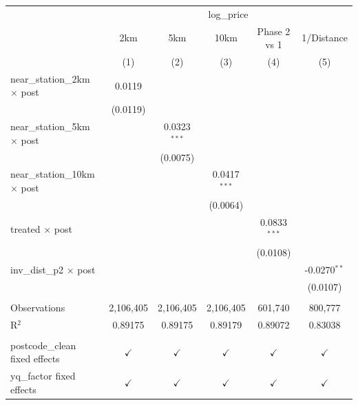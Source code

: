    \begin{tabular}{lccccc}
      \toprule
       & \multicolumn{5}{c}{log\_price}\\
                                           & 2km           & 5km            & 10km           & Phase 2 vs 1   & 1/Distance \\   
                                           & (1)           & (2)            & (3)            & (4)            & (5)\\  
      \midrule 
      near\_station\_2km $\times$ post     & 0.0119        &                &                &                &   \\   
                                           & (0.0119)      &                &                &                &   \\   
      near\_station\_5km $\times$ post     &               & 0.0323$^{***}$ &                &                &   \\   
                                           &               & (0.0075)       &                &                &   \\   
      near\_station\_10km $\times$ post    &               &                & 0.0417$^{***}$ &                &   \\   
                                           &               &                & (0.0064)       &                &   \\   
      treated $\times$ post                &               &                &                & 0.0833$^{***}$ &   \\   
                                           &               &                &                & (0.0108)       &   \\   
      inv\_dist\_p2 $\times$ post          &               &                &                &                & -0.0270$^{**}$\\   
                                           &               &                &                &                & (0.0107)\\   
       \\
      Observations                         & 2,106,405     & 2,106,405      & 2,106,405      & 601,740        & 800,777\\  
      R$^2$                                & 0.89175       & 0.89175        & 0.89179        & 0.89072        & 0.83038\\  
       \\
      postcode\_clean fixed effects        & $\checkmark$  & $\checkmark$   & $\checkmark$   & $\checkmark$   & $\checkmark$\\   
      yq\_factor fixed effects             & $\checkmark$  & $\checkmark$   & $\checkmark$   & $\checkmark$   & $\checkmark$\\   
      \bottomrule
   \end{tabular}
